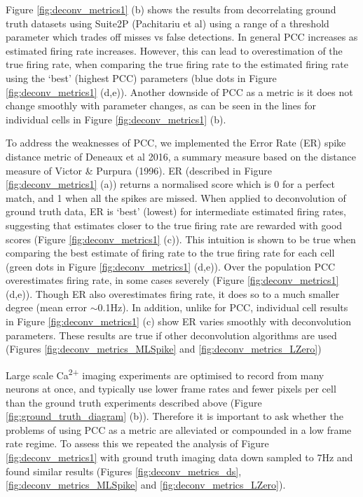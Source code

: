 \documentclass[a4paper]{article}
\begin{document}
Figure \ref{fig:deconv_metrics1} (b) shows the results from decorrelating ground truth datasets using Suite2P (Pachitariu et al) using a range of a threshold parameter which trades off misses vs false detections. In general PCC increases as estimated firing rate increases. However, this can lead to overestimation of the true firing rate, when comparing the true firing rate to the estimated firing rate using the `best' (highest PCC) parameters (blue dots in Figure \ref{fig:deconv_metrics1} (d,e)). Another downside of PCC as a metric is it does not change smoothly with parameter changes, as can be seen in the lines for individual cells in Figure \ref{fig:deconv_metrics1} (b).

To address the weaknesses of PCC, we implemented the Error Rate (ER) spike distance metric of Deneaux et al 2016, a summary measure based on the distance measure of Victor \& Purpura (1996). ER (described in Figure \ref{fig:deconv_metrics1} (a)) returns a normalised score which is 0 for a perfect match, and 1 when all the spikes are missed. When applied to deconvolution of ground truth data, ER is `best' (lowest) for intermediate estimated firing rates, suggesting that estimates closer to the true firing rate are rewarded with good scores (Figure \ref{fig:deconv_metrics1} (c)). This intuition is shown to be true when comparing the best estimate of firing rate to the true firing rate for each cell (green dots in Figure \ref{fig:deconv_metrics1} (d,e)). Over the population PCC overestimates firing rate, in some cases severely (Figure \ref{fig:deconv_metrics1} (d,e)). Though ER also overestimates firing rate, it does so to a much smaller degree (mean error $\sim$0.1Hz). In addition, unlike for PCC, individual cell results in Figure \ref{fig:deconv_metrics1} (c) show ER varies smoothly with deconvolution parameters. These results are true if other deconvolution algorithms are used (Figures \ref{fig:deconv_metrics_MLSpike} and \ref{fig:deconv_metrics_LZero})

Large scale Ca\textsuperscript{2+} imaging experiments are optimised to record from many neurons at once, and typically use lower frame rates and fewer pixels per cell than the ground truth experiments described above (Figure \ref{fig:ground_truth_diagram} (b)). Therefore it is important to ask whether the problems of using PCC as a metric are alleviated or compounded in a low frame rate regime. To assess this we repeated the analysis of Figure \ref{fig:deconv_metrics1}  with ground truth imaging data down sampled to 7Hz and found similar results (Figures \ref{fig:deconv_metrics_ds}, \ref{fig:deconv_metrics_MLSpike} and \ref{fig:deconv_metrics_LZero}).
\end{document}
